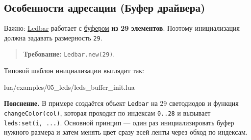 \subsection{Особенности адресации (Буфер драйвера)}
Важно: \hyperlink{term:ledbar}{Ledbar} работает с \hyperlink{term:buffer}{буфером} \textbf{из 29 элементов}. Поэтому инициализация должна задавать размерность \verb|29|.
\begin{quote}
\textbf{Требование:} \verb|Ledbar.new(29)|.
\end{quote}

Типовой шаблон инициализации выглядит так:

\begin{codefile}{lua/examples/05_leds/leds_buffer_init.lua}
\end{codefile}

\textbf{Пояснение.} В примере создаётся объект \verb|Ledbar| на 29 светодиодов и функция \verb|changeColor(col)|, которая проходит по индексам \verb|0..28| и вызывает \verb|leds:set(i, ...)|. Основной принцип — один раз инициализировать буфер нужного размера и затем менять цвет сразу всей ленты через обход по индексам.
